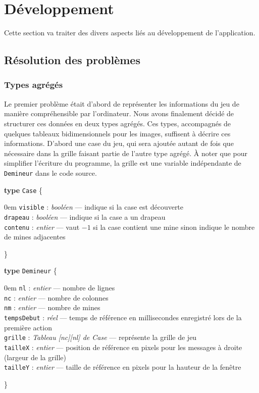 \documentclass[a4paper, 12pt, oneside]{article}
\newenvironment{typeag}[1][]{\noindent \textbf{type} \texttt{#1} \{\begin{addmargin}[2em]{0em}}{\end{addmargin}\}}
\newcommand{\variable}[3]{\noindent \texttt{#1} : \textit{#2} --- #3}
\newcommand{\var}[1]{\texttt{#1}}
\begin{document}
\newpage
\section{Développement}
Cette section va traiter des divers aspects liés au développement de l'application.
\subsection{Résolution des problèmes}

\subsubsection{Types agrégés}
Le premier problème était d'abord de représenter les informations du jeu de manière compréhensible par l'ordinateur. Nous avons finalement décidé de structurer ces données en deux types agrégés. Ces types, accompagnés de quelques tableaux bidimensionnels pour les images, suffisent à décrire ces informations. D'abord une case du jeu, qui sera ajoutée autant de fois que nécessaire dans la grille faisant partie de l'autre type agrégé. À noter que pour simplifier l'écriture du programme, la grille est une variable indépendante de \var{Demineur} dans le code source.

\smallskip
\begin{typeag}[Case]
	\variable{visible}{booléen}{indique si la case est découverte} \\
	\variable{drapeau}{booléen}{indique si la case a un drapeau} \\
	\variable{contenu}{entier}{vaut $-1$ si la case contient une mine sinon indique le nombre de mines adjacentes}
\end{typeag}

\begin{typeag}[Demineur]
	\variable{nl}{entier}{nombre de lignes} \\
	\variable{nc}{entier}{nombre de colonnes} \\
	\variable{nm}{entier}{nombre de mines} \\
	\variable{tempsDebut}{réel}{temps de référence en millisecondes enregistré lors de la première action} \\
	\variable{grille}{Tableau [nc][nl] de Case}{représente la grille de jeu} \\
	\variable{tailleX}{entier}{position de référence en pixels pour les messages à droite (largeur de la grille)} \\
	\variable{tailleY}{entier}{taille de référence en pixels pour la hauteur de la fenêtre}
\end{typeag}\smallskip
\end{document}
